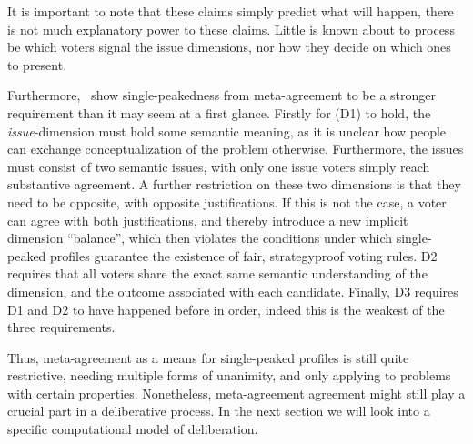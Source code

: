 It is important to note that these claims simply predict what will happen,
there is not much explanatory power to these claims. Little is known about to
process be which voters signal the issue dimensions, nor how they decide on
which ones to present.

Furthermore,~\citet{ottonelliElusiveNotionMetaagreement2013} show
single-peakedness from meta-agreement to be a stronger requirement than it may
seem at a first glance. Firstly for (D1) to hold, the \emph{issue}-dimension
must hold some semantic meaning, as it is unclear how people can exchange
conceptualization of the problem otherwise. Furthermore, the issues must
consist of two semantic issues, with only one issue voters simply reach substantive
agreement. A further restriction on these two dimensions is that they need to
be opposite, with opposite justifications. If this is not the case, a voter can
agree with both justifications, and thereby introduce a new implicit dimension
``balance'', which then violates the conditions under which single-peaked
profiles guarantee the existence of fair, strategyproof voting rules. D2
requires that all voters share the exact same semantic understanding of the
dimension, and the outcome associated with each candidate. Finally, D3 requires
D1 and D2 to have happened before in order, indeed this is the weakest of the
three requirements.

Thus, meta-agreement as a means for single-peaked profiles is still quite
restrictive, needing multiple forms of unanimity, and only applying to problems
with certain properties. Nonetheless,  meta-agreement agreement might still
play a crucial part in a deliberative process. In the next section we will
look into a specific computational model of deliberation.


